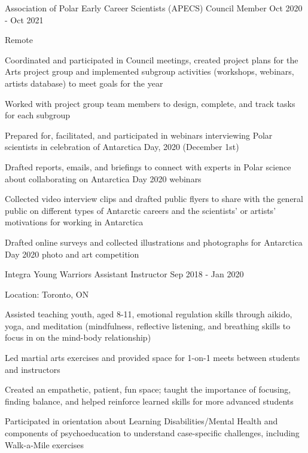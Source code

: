 \documentclass{../styles/cv}
\begin{document}
\subsectionpositiondate
    {Association of Polar Early Career Scientists (APECS)}
    {Council Member}
    {Oct 2020 - Oct 2021}
\resumesublistbegin
    \item Remote
    \item Coordinated and participated in Council meetings, created project plans for the Arts project group and implemented subgroup activities (workshops, webinars, artists database) to meet goals for the year
    \item Worked with project group team members to design, complete, and track tasks for each subgroup
    \item Prepared for, facilitated, and participated in webinars interviewing Polar scientists in celebration of Antarctica Day, 2020 (December 1st)
    \item Drafted reports, emails, and briefings to connect with experts in Polar science about collaborating on Antarctica Day 2020 webinars
    \item Collected video interview clips and drafted public flyers to share with the general public on different types of Antarctic careers and the scientists' or artists' motivations for working in Antarctica
    \item Drafted online surveys and collected illustrations and photographs for Antarctica Day 2020 photo and art competition
\resumesublistend

\subsectionpositiondate
    {Integra Young Warriors}
    {Assistant Instructor}
    {Sep 2018 - Jan 2020}
\resumesublistbegin
    \item Location: Toronto, ON
    \item Assisted teaching youth, aged 8-11, emotional regulation skills through aikido, yoga, and meditation (mindfulness, reflective listening, and breathing skills to focus in on the mind-body relationship)
    \item Led martial arts exercises and provided space for 1-on-1 meets between students and instructors
    \item Created an empathetic, patient, fun space; taught the importance of focusing, finding balance, and helped reinforce learned skills for more advanced students
    \item Participated in orientation about Learning Disabilities/Mental Health and components of psychoeducation to understand case-specific challenges, including Walk-a-Mile exercises
\resumesublistend
\end{document}
